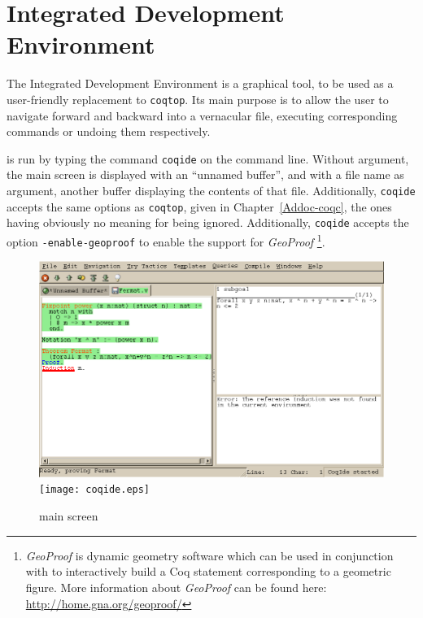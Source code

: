 \chapter{\Coq{} Integrated Development Environment}
\label{Addoc-coqide}

The \Coq{} Integrated Development Environment is a graphical tool, to
be used as a user-friendly replacement to \texttt{coqtop}. Its main
purpose is to allow the user to navigate forward and backward into a
\Coq{} vernacular file, executing corresponding commands or undoing
them respectively. %

\CoqIDE{} is run by typing the command \verb|coqide| on the command
line. Without argument, the main screen is displayed with an ``unnamed
buffer'', and with a file name as argument, another buffer displaying
the contents of that file. Additionally, \verb|coqide| accepts the same
options as \verb|coqtop|, given in Chapter~\ref{Addoc-coqc}, the ones having
obviously no meaning for \CoqIDE{} being ignored. Additionally, \verb|coqide| accepts the option \verb|-enable-geoproof| to enable the support for \emph{GeoProof} \footnote{\emph{GeoProof} is dynamic geometry software which can be used in conjunction with \CoqIDE{} to interactively build a Coq statement corresponding to a geometric figure. More information about \emph{GeoProof} can be found here: \url{http://home.gna.org/geoproof/} }. 
  

\begin{figure}[t]
\begin{center}
\ifpdf   %
\includegraphics[width=1.0\textwidth]{coqide.png}
\else
\texttt{[image: coqide.eps]}
\fi
\end{center}
\caption{\CoqIDE{} main screen}
\label{fig:coqide}
\end{figure}

